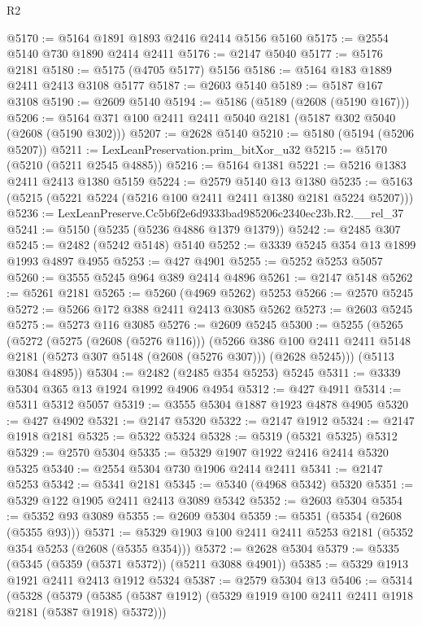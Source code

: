 \begin{lexlean}{R2}
\begin{coremodule}
@5170 := @5164 @1891 @1893 @2416 @2414 @5156 @5160
@5175 := @2554 @5140 @730 @1890 @2414 @2411
@5176 := @2147 @5040
@5177 := @5176 @2181
@5180 := @5175 (@4705 @5177) @5156
@5186 := @5164 @183 @1889 @2411 @2413 @3108 @5177
@5187 := @2603 @5140
@5189 := @5187 @167 @3108
@5190 := @2609 @5140
@5194 := @5186 (@5189 (@2608 (@5190 @167)))
@5206 := @5164 @371 @100 @2411 @2411 @5040 @2181 (@5187 @302 @5040 (@2608 (@5190 @302)))
@5207 := @2628 @5140
@5210 := @5180 (@5194 (@5206 @5207))
@5211 := LexLeanPreservation.prim_bitXor_u32
@5215 := @5170 (@5210 (@5211 @2545 @4885))
@5216 := @5164 @1381
@5221 := @5216 @1383 @2411 @2413 @1380 @5159
@5224 := @2579 @5140 @13 @1380
@5235 := @5163 (@5215 (@5221 @5224 (@5216 @100 @2411 @2411 @1380 @2181 @5224 @5207)))
@5236 := LexLeanPreserve.Cc5b6f2e6d9333bad985206c2340ec23b.R2.__rel_37
@5241 := @5150 (@5235 (@5236 @4886 @1379 @1379))
@5242 := @2485 @307
@5245 := @2482 (@5242 @5148) @5140
@5252 := @3339 @5245 @354 @13 @1899 @1993 @4897 @4955
@5253 := @427 @4901
@5255 := @5252 @5253 @5057
@5260 := @3555 @5245 @964 @389 @2414 @4896
@5261 := @2147 @5148
@5262 := @5261 @2181
@5265 := @5260 (@4969 @5262) @5253
@5266 := @2570 @5245
@5272 := @5266 @172 @388 @2411 @2413 @3085 @5262
@5273 := @2603 @5245
@5275 := @5273 @116 @3085
@5276 := @2609 @5245
@5300 := @5255
    (@5265
      (@5272
        (@5275 (@2608 (@5276 @116)))
        (@5266
          @386
          @100
          @2411
          @2411
          @5148
          @2181
          (@5273 @307 @5148 (@2608 (@5276 @307)))
          (@2628 @5245)))
      (@5113 @3084 @4895))
@5304 := @2482 (@2485 @354 @5253) @5245
@5311 := @3339 @5304 @365 @13 @1924 @1992 @4906 @4954
@5312 := @427 @4911
@5314 := @5311 @5312 @5057
@5319 := @3555 @5304 @1887 @1923 @4878 @4905
@5320 := @427 @4902
@5321 := @2147 @5320
@5322 := @2147 @1912
@5324 := @2147 @1918 @2181
@5325 := @5322 @5324
@5328 := @5319 (@5321 @5325) @5312
@5329 := @2570 @5304
@5335 := @5329 @1907 @1922 @2416 @2414 @5320 @5325
@5340 := @2554 @5304 @730 @1906 @2414 @2411
@5341 := @2147 @5253
@5342 := @5341 @2181
@5345 := @5340 (@4968 @5342) @5320
@5351 := @5329 @122 @1905 @2411 @2413 @3089 @5342
@5352 := @2603 @5304
@5354 := @5352 @93 @3089
@5355 := @2609 @5304
@5359 := @5351 (@5354 (@2608 (@5355 @93)))
@5371 := @5329 @1903 @100 @2411 @2411 @5253 @2181 (@5352 @354 @5253 (@2608 (@5355 @354)))
@5372 := @2628 @5304
@5379 := @5335 (@5345 (@5359 (@5371 @5372)) (@5211 @3088 @4901))
@5385 := @5329 @1913 @1921 @2411 @2413 @1912 @5324
@5387 := @2579 @5304 @13
@5406 := @5314
    (@5328
      (@5379 (@5385 (@5387 @1912) (@5329 @1919 @100 @2411 @2411 @1918 @2181 (@5387 @1918) @5372)))

\end{coremodule}
\end{lexlean}
